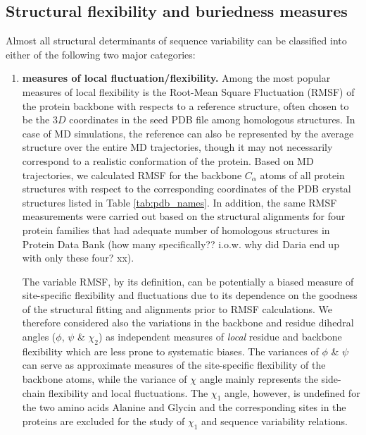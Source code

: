\documentclass[preprint,12pt]{article}
\begin{document}
    \subsection{Structural flexibility and buriedness measures}

        Almost all structural determinants of sequence variability can be classified into either of the following two major categories:

        \begin{enumerate}

            \item {\bf measures of local fluctuation/flexibility.}
                Among the most popular measures of local flexibility is the Root-Mean Square Fluctuation (RMSF) of the protein backbone with respects to a reference structure, often chosen to be the $3D$ coordinates in the seed PDB file among homologous structures. In case of MD simulations, the reference can also be represented by the average structure over the entire MD trajectories, though it may not necessarily correspond to a realistic conformation of the protein. Based on MD trajectories, we calculated RMSF for the backbone $C_\alpha$ atoms of all protein structures with respect to the corresponding coordinates of the PDB crystal structures listed in Table \ref{tab:pdb_names}. In addition, the same RMSF measurements were carried out based on the structural alignments for four protein families that had adequate number of homologous structures in Protein Data Bank (how many specifically?? i.o.w. why did Daria end up with only these four? xx).

                The variable RMSF, by its definition, can be potentially a biased measure of site-specific flexibility and fluctuations due to its dependence on the goodness of the structural fitting and alignments prior to RMSF calculations. We therefore considered also the variations in the backbone and residue dihedral angles ($\phi$, $\psi$ \& $\chi_2$) as independent measures of {\it local} residue and backbone flexibility which are less prone to systematic biases. The variances of $\phi$ \& $\psi$ can serve as approximate measures of the site-specific flexibility of the backbone atoms, while the variance of $\chi$ angle mainly represents the side-chain flexibility and local fluctuations. The $\chi_1$ angle, however, is undefined for the two amino acids Alanine and Glycin and the corresponding sites in the proteins are excluded for the study of $\chi_1$ and sequence variability relations.


\end{enumerate}
\end{document}
